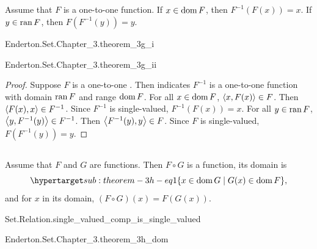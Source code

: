 \documentclass{report}
\begin{document}
\subsection{}%

  \begin{theorem}[3G]
    Assume that $F$ is a one-to-one function.
    If $x \in \mathop{\text{dom}}{F}$, then $F^{-1}(F(x)) = x$.
    If $y \in \mathop{\text{ran}}{F}$, then $F(F^{-1}(y)) = y$.
  \end{theorem}

    {Enderton.Set.Chapter\_3.theorem\_3g\_i}

    {Enderton.Set.Chapter\_3.theorem\_3g\_ii}

  \begin{proof}
    Suppose $F$ is a one-to-one .
    Then  indicates $F^{-1}$ is a one-to-one
      function with domain $\mathop{\text{ran}}{F}$ and range $\mathop{\text{dom}}{F}$.
    For all $x \in \mathop{\text{dom}}{F}$, $\left< x, F(x) \right> \in F$.
    Then $\left< F(x), x \right> \in F^{-1}$.
    Since $F^{-1}$ is single-valued, $F^{-1}(F(x)) = x$.
    For all $y \in \mathop{\text{ran}}{F}$, $\left< y, F^{-1}(y) \right> \in F^{-1}$.
    Then $\left< F^{-1}(y), y \right> \in F$.
    Since $F$ is single-valued, $F(F^{-1}(y)) = y$.
  \end{proof}

\subsection{}%

  \begin{theorem}[3H]
    Assume that $F$ and $G$ are functions.
    Then $F \circ G$ is a function, its domain is
      \begin{equation}
        \hyperlabel{sub:theorem-3h-eq1}
        \{x \in \dom{G} \mid G(x) \in \dom{F}\},
      \end{equation}
      and for $x$ in its domain, $(F \circ G)(x) = F(G(x))$.
  \end{theorem}

    {Set.Relation.single\_valued\_comp\_is\_single\_valued}

    {Enderton.Set.Chapter\_3.theorem\_3h\_dom}
\end{document}
